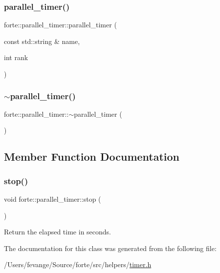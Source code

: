 \subsubsection{\texorpdfstring{parallel\+\_\+timer()}{parallel\_timer()}}
{\footnotesize\ttfamily forte\+::parallel\+\_\+timer\+::parallel\+\_\+timer (\begin{DoxyParamCaption}\item[{const std\+::string \&}]{name,  }\item[{int}]{rank }\end{DoxyParamCaption})\hspace{0.3cm}{\ttfamily [inline]}}

\mbox{\label{classforte_1_1parallel__timer_abf4df15d53481277b7134fc74a7f1db3}} 
\subsubsection{\texorpdfstring{$\sim$parallel\+\_\+timer()}{~parallel\_timer()}}
{\footnotesize\ttfamily forte\+::parallel\+\_\+timer\+::$\sim$parallel\+\_\+timer (\begin{DoxyParamCaption}{ }\end{DoxyParamCaption})\hspace{0.3cm}{\ttfamily [inline]}}



\subsection{Member Function Documentation}
\mbox{\label{classforte_1_1parallel__timer_abacc218012f9ecd9a6f709dc40949948}} 
\subsubsection{\texorpdfstring{stop()}{stop()}}
{\footnotesize\ttfamily void forte\+::parallel\+\_\+timer\+::stop (\begin{DoxyParamCaption}{ }\end{DoxyParamCaption})\hspace{0.3cm}{\ttfamily [inline]}}



Return the elapsed time in seconds. 



The documentation for this class was generated from the following file\+:\begin{DoxyCompactItemize}
\item 
/\+Users/fevange/\+Source/forte/src/helpers/\mbox{\hyperlink{timer_8h}{timer.\+h}}\end{DoxyCompactItemize}
